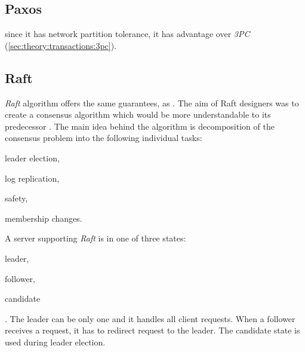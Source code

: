 \subsection{Paxos}

since it has network partition tolerance, it has advantage over \emph{3PC} (\ref{sec:theory:transactions:3pc}).







\subsection{Raft}
\emph{Raft} algorithm offers the same guarantees, as \paxos. 
The aim of Raft designers was to create a consensus algorithm which would be more understandable to its predecessor \cite{ongaro2014search}. 
The main idea behind the algorithm is decomposition of the consensus problem into the following individual tasks:
\begin{enumerate*}
\item leader election,
\item log replication,
\item safety,
\item membership changes.
\end{enumerate*} 
 A server supporting \emph{Raft} is in one of three states: \begin{enumerate*} \item leader, \item follower, \item candidate \end{enumerate*}. The leader can be only one and it handles all client requests. When a follower receives a request, it has to redirect request to the leader. The candidate state is used during leader election. 

